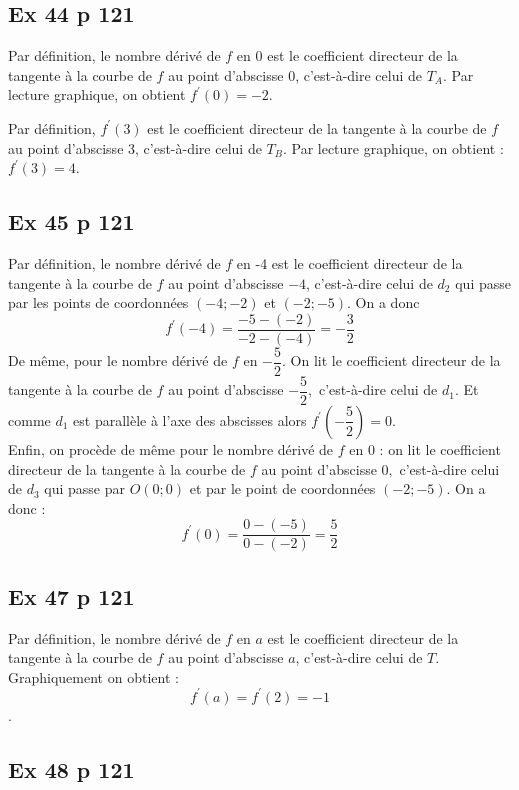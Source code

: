 \documentclass[12pt,a4paper]{book}
\begin{document}
\subsection*{Ex 44 p 121}
\begin{enumMet}
    \item Par définition, le nombre dérivé de $f$ en 0 est le coefficient directeur de la tangente à la courbe de $f$ au point d'abscisse 0, c'est-à-dire celui de $T_{A}$. Par lecture graphique, on obtient $f^{\prime}(0)=-2$.
    \item Par définition, $f^{\prime}(3)$ est le coefficient directeur de la tangente à la courbe de $f$ au point d'abscisse 3, c'est-à-dire celui de $T_{B}$. Par lecture graphique, on obtient : $f^{\prime}(3)=4$.
\end{enumMet}

\subsection*{Ex 45 p 121}

Par définition, le nombre dérivé de $f$ en -4 est le coefficient directeur de la tangente à la courbe de $f$ au point d'abscisse $-4$, c'est-à-dire celui de $d_{2}$ qui passe par les points de coordonnées $(-4 ;-2)$ et
$(-2 ;-5)$. On a donc
$$
f^{\prime}(-4)=\dfrac{-5-(-2)}{-2-(-4)}=-\dfrac{3}{2}
$$
De même, pour le nombre dérivé de $f$ en $-\dfrac{5}{2}$. On lit le coefficient directeur de la tangente à la courbe de $f$ au point d'abscisse $-\dfrac{5}{2},$ c'est-à-dire celui de $d_{1}$. Et comme $d_{1}$ est parallèle à l'axe des abscisses
alors $f^{\prime}\left(-\dfrac{5}{2}\right)=0$.\\
Enfin, on procède de même pour le nombre dérivé de $f$ en 0 : on lit le coefficient directeur de la tangente à la courbe de $f$ au point d'abscisse $0,$ c'est-à-dire celui de $d_{3}$ qui passe par $O(0 ; 0)$ et par
le point de coordonnées $(-2 ;-5)$. On a donc :
$$f^{\prime}(0)=\dfrac{0-(-5)}{0-(-2)}=\dfrac{5}{2}$$

\subsection*{Ex 47 p 121}

Par définition, le nombre dérivé de $f$ en $a$ est le coefficient directeur de la tangente à la courbe de $f$ au point d'abscisse $a$, c'est-à-dire celui de $T$. Graphiquement on obtient : $$f^{\prime}(a)=f^{\prime}(2)=-1$$.

\subsection*{Ex 48 p 121}
\end{document}
